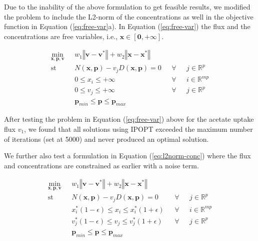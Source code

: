 \documentclass[10pt]{report}
\begin{document}
	Due to the inability of the above formulation to get feasible results, we modified the problem to include the L2-norm of the concentrations as well in the objective function in Equation (\ref{eq:free-var}a). In Equation (\ref{eq:free-var}) the flux and the concentrations are free variables, i.e.,  $\mathbf{x}\in\left[\mathbf{0},+\mathbf{\infty}\right]$. 
	\begin{center}
		\begin{subequations}\label{eq:free-var}
			\begin{align}
			\underset{\mathbf{x},\mathbf{p},\mathbf{v}}{\mathrm{min}} & \text{      }w_1\left\Vert \mathbf{v}-\mathbf{v}^*\right\Vert + w_2\left\Vert \mathbf{x}-\mathbf{x}^*\right\Vert\\
			\mathrm{st}& \text{      }N(\mathbf{x},\mathbf{p}) - v_jD(\mathbf{x},\mathbf{p}) = 0 & \text{  }\forall & \text{ }j\in\mathbb{R}^p\\
			& \text{      }0\le x_i \le +\infty & \text{  }\forall & \text{ }i\in\mathbb{R}^{mp}\\	
			& \text{      }0\le v_j \le +\infty & \text{  }\forall & \text{ }j\in\mathbb{R}^{p}\\		
			& \text{      }\mathbf{p}_{min} \le \mathbf{p} \le \mathbf{p}_{max}
			\end{align}
		\end{subequations}
	\end{center}
After testing the problem in Equation (\ref{eq:free-var}) above for the acetate uptake flux $v_1$, we found that all solutions using IPOPT exceeded the maximum number of iterations (set at 5000) and never produced an optimal solution.
	
	We further also test a formulation in Equation (\ref{eq:l2norm-conc}) where the flux and concentrations are constrained as earlier with a noise term.	
	\begin{center}
		\begin{subequations}\label{eq:l2norm-conc}
			\begin{align}
			\underset{\mathbf{x},\mathbf{p},\mathbf{v}}{\mathrm{min}} & \text{      }w_1\left\Vert \mathbf{v}-\mathbf{v}^*\right\Vert + w_2\left\Vert \mathbf{x}-\mathbf{x}^*\right\Vert\\
			\mathrm{st}& \text{      }N(\mathbf{x},\mathbf{p}) - v_jD(\mathbf{x},\mathbf{p}) = 0 & \text{  }\forall & \text{ }j\in\mathbb{R}^p\\
			& \text{      }x^*_i(1-\epsilon)\le x_i \le x^*_i(1+\epsilon) & \text{  }\forall & \text{ }i\in\mathbb{R}^{mp}\\	
			& \text{      }v^*_j(1-\epsilon)\le v_j \le v^*_j(1+\epsilon) & \text{  }\forall & \text{ }j\in\mathbb{R}^{p}\\		
			& \text{      }\mathbf{p}_{min} \le \mathbf{p} \le \mathbf{p}_{max}
			\end{align}
		\end{subequations}
	\end{center}
\end{document}
